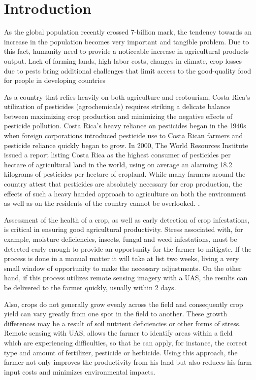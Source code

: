 \section{Introduction}
As the global population recently crossed 7-billion mark, the tendency towards an increase in the population becomes very important and tangible problem. Due to this fact, humanity need to provide a noticeable increase in agricultural products output. Lack of farming lands, high labor costs, changes in climate, crop losses due to pests bring additional challenges that limit access to the good-quality food for people in developing countries\cite{7551564}

As a country that relies heavily on both agriculture and ecotourism, Costa Rica's utilization of pesticides (agrochemicals) requires striking a delicate balance between maximizing crop production and minimizing the negative effects of pesticide pollution. Costa Rica's heavy reliance on pesticides began in the 1940s when foreign corporations introduced pesticide use to Costa Rican farmers and pesticide reliance quickly began to grow. In 2000, The World Resources Institute issued a report listing Costa Rica as the highest consumer of pesticides per hectare of agricultural land in the world, using on average an alarming 18.2 kilograms of pesticides per hectare of cropland. While many farmers around the country attest that pesticides are absolutely necessary for crop production, the effects of such a heavy handed approach to agriculture on both the environment as well as on the residents of the country cannot be overlooked. \cite{UNA}.

Assessment of the health of a crop, as well as early detection of crop infestations, is critical in ensuring good agricultural productivity. Stress associated with, for example, moisture deficiencies, insects, fungal and weed infestations, must be detected early enough to provide an opportunity for the farmer to mitigate. If the process is done in a manual matter it will take at list two weeks, living a very small window of opportunity to make the necessary adjustments. On the other hand, if this process utilizes remote sensing imagery with a UAS, the results can be delivered to the farmer quickly, usually within 2 days.\cite{crops}

Also, crops do not generally grow evenly across the field and consequently crop yield can vary greatly from one spot in the field to another. These growth differences may be a result of soil nutrient deficiencies or other forms of stress. Remote sensing with UAS, allows the farmer to identify areas within a field which are experiencing difficulties, so that he can apply, for instance, the correct type and amount of fertilizer, pesticide or herbicide. Using this approach, the farmer not only improves the productivity from his land but also reduces his farm input costs and minimizes environmental impacts.\cite{crops}

